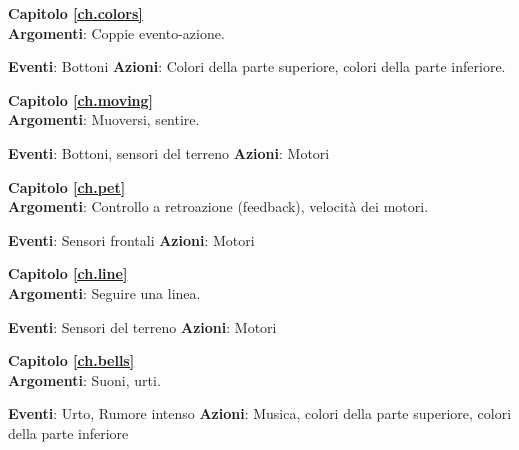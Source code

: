 \bigskip

{\centering \textbf{Capitolo \ref{ch.colors}}\\}
\textbf{Argomenti}: Coppie evento-azione.

\textbf{Eventi}: Bottoni \hfill \textbf{Azioni}: Colori della parte superiore, colori della parte inferiore.

 \hfill {} \quad {}

\bigskip

{\centering \textbf{Capitolo \ref{ch.moving}}\\}
\textbf{Argomenti}: Muoversi, sentire.

\textbf{Eventi}: Bottoni, sensori del terreno \hfill \textbf{Azioni}: Motori

 \quad {} \hfill  {}

\bigskip

{\centering \textbf{Capitolo \ref{ch.pet}}\\}
\textbf{Argomenti}: Controllo a retroazione (feedback), velocità dei motori.

\textbf{Eventi}: Sensori frontali \hfill \textbf{Azioni}: Motori

 \hfill {}

\bigskip

{\centering \textbf{Capitolo \ref{ch.line}}\\}
\textbf{Argomenti}: Seguire una linea.

\textbf{Eventi}: Sensori del terreno \hfill \textbf{Azioni}: Motori

 \hfill {}

\bigskip

{\centering \textbf{Capitolo \ref{ch.bells}}\\}
\textbf{Argomenti}: Suoni, urti.

\textbf{Eventi}: Urto, Rumore intenso \hfill \textbf{Azioni}: Musica, colori della parte superiore, colori della parte inferiore

 \quad {} \hfill {} \quad {} \quad {}

\bigskip

